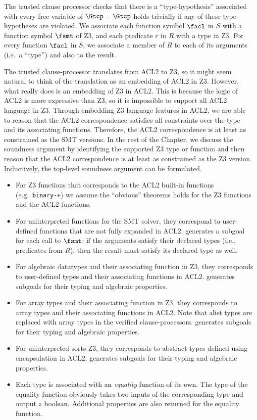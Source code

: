 The trusted clause processor checks that there is a ``type-hypothesis'' associated
with every free variable of $\Gtcp$ -- $\Gtcp$ holds trivially if any of these
type-hypotheses are violated.
We associate each function symbol $\facl$ in $S$ with a function symbol $\fsmt$
of Z3, and each predicate $r$ in $R$ with a type in Z3.
For every function $\facl$ in $S$, we associate a member of $R$ to each of its
arguments (i.e.\ a ``type'') and also to the result.

The trusted clause-processor translates from ACL2 to Z3, so it might seem
natural to think of the translation as an embedding of ACL2 in Z3.
However, what \smtlink{} really does is an embedding of Z3 in ACL2.
This is because the logic of ACL2 is more expressive than Z3, so it is
impossible to support all ACL2 language in Z3. 
Through embedding Z3 language features in ACL2, we are able to reason that the
ACL2 correspondence satisfies all constraints over the type and its associating
functions.
Therefore, the ACL2 correspondence is at least as constrained as the SMT
versions.
In the rest of the Chapter, we discuss the soundness argument by identifying the
supported Z3 type or function and then reason that the ACL2 correspondence is at
least as constrained as the Z3 version. Inductively, the top-level soundness
argument can be formulated.
\begin{itemize}
\item For Z3 functions that corresponds to the ACL2 built-in functions (e.g.\
  \texttt{binary-+}) we assume the ``obvious'' theorems holds for the Z3
  functions and the ACL2 functions.
\item For uninterpreted functions for the \acs{SMT} solver, they correspond to
  user-defined functions that are not fully expanded in ACL2.
  \smtlink{} generates a subgoal for each call to $\fsmt$: if the arguments
  satisfy their declared types (i.e., predicates from $R$), then the  result
  must satisfy its declared type as well.
\item For algebraic datatypes and their associating function in Z3, they
  corresponds to user-defined types and their associating functions in ACL2.
  \smtlink{} generates subgoals for their typing and algebraic properties.
\item For array types and their associating function in Z3, they
  corresponds to array types and their associating functions in ACL2.
  Note that alist types are replaced with array types in the verified
  clause-processors.
  \smtlink{} generates subgoals for their typing and algebraic properties.
\item For uninterpreted sorts Z3, they corresponds to abstract types defined
  using encapsulation in ACL2.
  \smtlink{} generates subgoals for their typing and algebraic properties.
\item Each type is associated with an \emph{equality} function of its own. The
  type of the equality function obviously takes two inputs of the corresponding
  type and output a boolean.
  Additional properties are also returned for the equality function.
\end{itemize}

